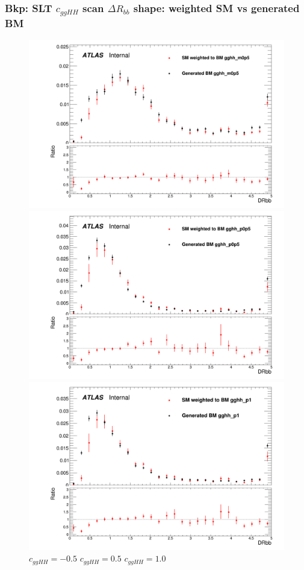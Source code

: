 \documentclass[twoside,11pt]{beamer}
\begin{document}
\begin{frame}
    \frametitle{Bkp: SLT $c_{ggHH}$ scan $\Delta R_{bb}$ shape: weighted SM vs generated BM}

    \begin{figure}
    \includegraphics[width=.32\textwidth]{figures/Method_B_all_latest/BMgghh_m0p5h_DRbb.png}
    \includegraphics[width=.32\textwidth]{figures/Method_B_all_latest/BMgghh_p0p5h_DRbb.png}
    \includegraphics[width=.32\textwidth]{figures/Method_B_all_latest/BMgghh_p1h_DRbb.png}
    $c_{ggHH} = -0.5$ \hspace{5em} $c_{ggHH} = 0.5$\hspace{5em} $c_{ggHH} = 1.0$
    \end{figure}


\end{frame}     
\end{document}
